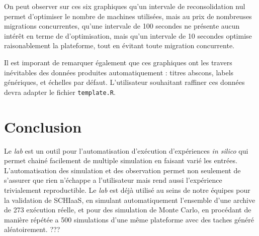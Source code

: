 \documentclass[parallelisme]{compas2017}
\begin{document}
On peut observer sur ces six graphiques qu'un intervale de reconsolidation nul 
permet d'optimiser le nombre de machines utilisées, mais au prix de nombreuses 
migrations concurrentes, qu'une intervale de 100 secondes ne présente aucun 
intérêt en terme de d'optimisation, mais qu'un intervale de 10 secondes 
optimise raisonablement la plateforme, tout en évitant toute migration 
concurrente.

Il est imporant de remarquer également que ces graphiques ont les travers 
inévitables des données produites automatiquement : titres abscons, labels 
génériques, et échelles par défaut. L'utilisateur souhaitant raffiner ces 
données devra adapter le fichier \texttt{template.R}.

\section{Conclusion}

Le \emph{lab} est un outil pour l'automatisation d'exécution d'expériences
\emph{in silico} qui permet chainé facilement de multiple simulation en faisant
varié les entrées. L'automatisation des simulation et des observation permet non
seulement de s'assurer que rien n'échappe a l'utilisateur mais rend aussi
l'expérience trivialement reproductible. Le \emph{lab} est déjà utilisé au seins
de notre équipes pour la validation de SCHIaaS, en simulant automatiquement
l'ensemble d'une archive de 273 exécution réelle, et pour des simulation de
Monte Carlo, en procédant de manière répétée a 500 simulations d'une même
plateforme avec des taches généré aléatoirement. ???



\end{document}
